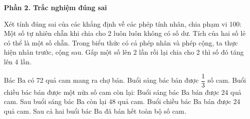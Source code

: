 \textbf{Phần 2. Trắc nghiệm đúng sai}

\begin{ex} %
Xét tính đúng sai của các khẳng định về các phép tính nhân, chia phạm vi 100:
\choiceTF
{\True Một số tự nhiên chẵn khi chia cho 2 luôn luôn không có số dư.}
{Tích của hai số lẻ có thể là một số chẵn.}
{\True Trong biểu thức có cả phép nhân và phép cộng, ta thực hiện nhân trước, cộng sau.}
{Gấp một số lên 2 lần rồi lại chia cho 2 thì số đó tăng lên 4 lần.}
\end{ex}

\begin{ex} %
Bác Ba có 72 quả cam mang ra chợ bán. Buổi sáng bác bán được $\dfrac{1}{3}$ số cam. Buổi chiều bác bán được một nửa số cam còn lại:
\choiceTF
{\True Buổi sáng bác Ba bán được 24 quả cam.}
{\True Sau buổi sáng bác Ba còn lại 48 quả cam.}
{\True Buổi chiều bác Ba bán được 24 quả cam.}
{Sau cả hai buổi bác Ba đã bán hết toàn bộ số cam.}
\end{ex}

